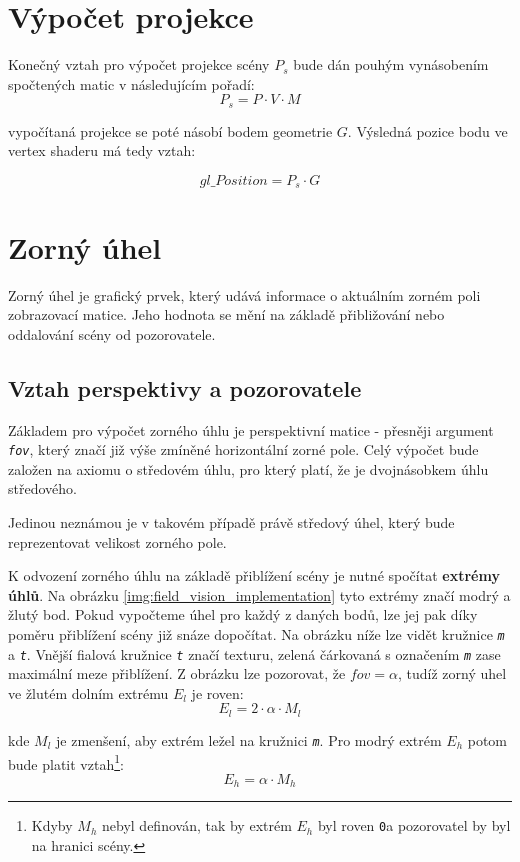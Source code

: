 \section{Výpočet projekce}
Konečný  vztah pro výpočet projekce scény $P_{s}$ bude dán pouhým vynásobením spočtených matic v následujícím pořadí:
$$ P_{s} = P \cdot V \cdot M  $$

 
vypočítaná projekce se poté násobí bodem geometrie $G$. Výsledná pozice bodu ve vertex shaderu má tedy   vztah:

$$ gl\_Position  = P_{s} \cdot G$$

\newpage

\section{Zorný úhel}
Zorný úhel je grafický prvek, který udává informace o aktuálním zorném poli zobrazovací matice. Jeho hodnota se mění na základě přibližování nebo oddalování scény od pozorovatele. 


\subsection{Vztah perspektivy a pozorovatele}
Základem pro výpočet zorného úhlu je perspektivní matice - přesněji argument \texttt{\textit{fov}}, který značí již výše zmíněné horizontální zorné pole. Celý výpočet bude  založen na axiomu o středovém úhlu, pro který platí, že je dvojnásobkem úhlu středového.\cite{planimetrie} 

Jedinou neznámou je v takovém případě právě středový úhel, který bude reprezentovat velikost zorného pole.

K odvození zorného úhlu na základě přiblížení scény je nutné spočítat \textbf{extrémy úhlů}. Na obrázku \ref{img:field_vision_implementation} tyto extrémy značí modrý a žlutý bod. Pokud vypočteme úhel pro každý z daných bodů, lze jej pak díky poměru přiblížení scény již snáze dopočítat. Na obrázku níže lze vidět kružnice \texttt{\textit{m}} a \texttt{\textit{t}}. Vnější fialová kružnice \texttt{\textit{t}} značí texturu, zelená čárkovaná  s označením \texttt{\textit{m}} zase maximální meze přiblížení. Z obrázku lze pozorovat, že $fov = \alpha$, tudíž zorný uhel ve žlutém dolním extrému $E_{l}$ je roven: $$ E_{l} = 2 \cdot \alpha \cdot M_{l} $$

kde $M_{l}$ je zmenšení, aby extrém ležel na kružnici \texttt{\textit{m}}. Pro modrý extrém $E_{h}$ potom bude platit vztah\footnote{Kdyby $M_{h}$ nebyl definován, tak by extrém $E_{h}$ byl roven \texttt{0}\degree a pozorovatel by byl na hranici scény.}: $$ E_{h} = \alpha \cdot M_{h} $$


